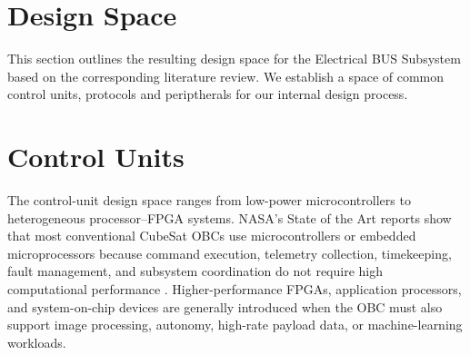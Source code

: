 \documentclass[10pt]{../datasheet}
\let\cite\citep
\begin{document}
\onecolumn

\section{Design Space}

This section outlines the resulting design space for the Electrical BUS
Subsystem based on the corresponding literature review. We establish a space of
common control units, protocols and periptherals for our internal design
process.

\section{Control Units}

The control-unit design space ranges from low-power microcontrollers to
heterogeneous processor--FPGA systems. NASA's State of the Art reports show
that most conventional CubeSat OBCs use microcontrollers or embedded
microprocessors because command execution, telemetry collection, timekeeping,
fault management, and subsystem coordination do not require high computational
performance \cite{nasa_soa_2022,nasa_soa_2023,nasa_soa_2024,nasa_soa_2026}.
Higher-performance FPGAs, application processors, and system-on-chip devices
are generally introduced when the OBC must also support image processing,
autonomy, high-rate payload data, or machine-learning workloads.
\end{document}

